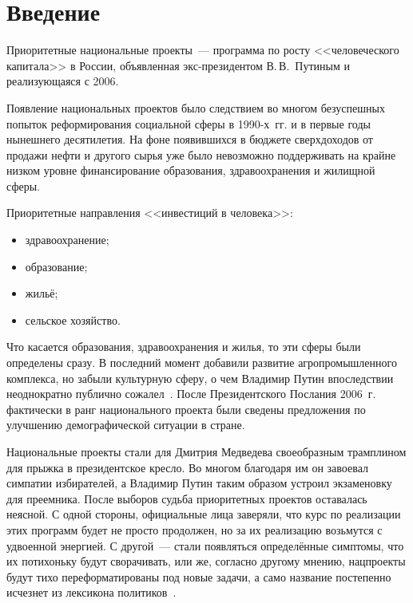 \documentclass[article, 12pt, russian, oneside]{ncc}
\begin{document}
 \thispagestyle{empty}
\tableofcontents
\newpage

\section*{Введение}

Приоритетные национальные проекты~--- программа по росту
<<человеческого капитала>> в России, объявленная экс-президентом
В.\,В.~Путиным и реализующаяся с 2006.

Появление национальных проектов было следствием во многом безуспешных
попыток реформирования социальной сферы в 1990-х~гг. и в первые годы
нынешнего десятилетия. На фоне появившихся в бюджете сверхдоходов от
продажи нефти и другого сырья уже было невозможно поддерживать на
крайне низком уровне финансирование образования, здравоохранения и
жилищной сферы.

Приоритетные направления <<инвестиций в человека>>:

\begin{itemize}
\item здравоохранение;
\item образование;
\item жильё;
\item сельское хозяйство.
\end{itemize}

Что касается образования, здравоохранения и жилья, то эти сферы были
определены сразу. В последний момент добавили развитие
агропромышленного комплекса, но забыли культурную сферу, о чем
Владимир Путин впоследствии неоднократно публично
сожалел~\cite{Spero}. После Президентского Послания 2006~г. фактически
в ранг национального проекта были сведены предложения по улучшению
демографической ситуации в стране.

Национальные проекты стали для Дмитрия Медведева своеобразным
трамплином для прыжка в президентское кресло. Во многом благодаря им
он завоевал симпатии избирателей, а Владимир Путин таким образом
устроил экзаменовку для преемника. После выборов судьба приоритетных
проектов оставалась неясной. С одной стороны, официальные лица
заверяли, что курс по реализации этих программ будет не просто
продолжен, но за их реализацию возьмутся с удвоенной энергией. С
другой~--- стали появляться определённые симптомы, что их потихоньку
будут сворачивать, или же, согласно другому мнению, нацпроекты будут
тихо переформатированы под новые задачи, а само название постепенно
исчезнет из лексикона политиков~\cite{Versia}.
\end{document}
